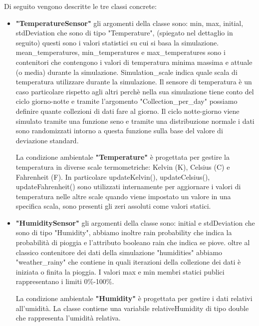 \documentclass{article}
\begin{document}
Di seguito vengono descritte le tre classi concrete:
\begin{itemize}
    \item{\textbf{"TemperatureSensor"} gli argomenti della classe sono: min, max, initial, stdDeviation  che sono di tipo "Temperature", (spiegato nel dettaglio in seguito) questi sono i valori statistici su cui si basa la simulazione. mean\_temperatures, min\_temperatures e max\_temperatures sono i contenitori che contengono i valori di temperatura minima massima e attuale (o media) durante la simulazione. Simulation\_scale indica quale scala di temperatura utilizzare durante la simulazione. Il sensore di temperatura è un caso particolare rispetto agli altri perchè nella sua simulazione tiene conto del ciclo giorno-notte e tramite l'argomento "Collection\_per\_day" possiamo definire quante collezioni di dati fare al giorno. Il ciclo notte-giorno viene simulato tramite una funzione seno e tramite una distribuzione normale i dati sono randomizzati intorno a questa funzione sulla base del valore di deviazione standard.
    \begin{itemize}
        La condizione ambientale \textbf{"Temperature"} è progettata per gestire la temperatura in diverse scale termometriche: Kelvin (K), Celsius (C) e Fahrenheit (F). In particolare updateKelvin(), updateCelsius(), updateFahrenheit() sono utilizzati internamente per aggiornare i valori di temperatura nelle altre scale quando viene impostato un valore in una specifica scala, sono presenti gli zeri assoluti come valori statici.
    \end{itemize}}
    
    \item {\textbf{"HumiditySensor"} gli argomenti della classe sono: initial e stdDeviation che sono di tipo "Humidity", abbiamo inoltre rain probability che indica la probabilità di pioggia e l'attributo booleano rain che indica se piove. oltre al classico contenitore dei dati della simulazione "humidities" abbiamo "weather\_rainy" che contiene in quali iterazioni della collezione dei dati è iniziata o finita la pioggia. I valori max e min membri statici publici rappresentano i limiti 0\%-100\%.
    \begin{itemize}
        La condizione ambientale \textbf{"Humidity"} è progettata per gestire i dati relativi all'umidità. La classe contiene una variabile relativeHumidity di tipo double che rappresenta l'umidità relativa.
    \end{itemize} }
    

\end{itemize}
\end{document}
